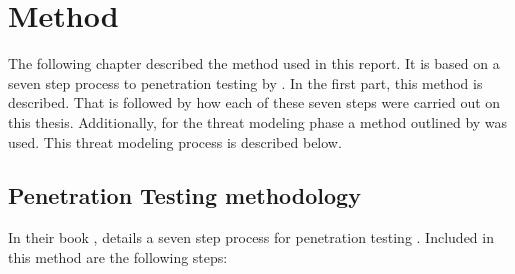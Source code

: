\chapter{Method} \label{ch:method}
The following chapter described the method used in this report. It is based on a seven step process to penetration testing by \textcite{weidman2014}. In the first part, this method is described. That is followed by how each of these seven steps were carried out on this thesis. Additionally, for the threat modeling phase a method outlined by \textcite{guzman2017iot} was used. This threat modeling process is described below.

\section{Penetration Testing methodology}
In their book , \citeauthor{weidman2014} details a seven step process for penetration testing \cite{weidman2014}. Included in this method are the following steps:
